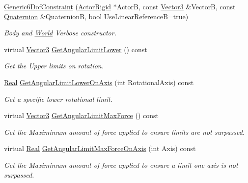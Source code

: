 \begin{DoxyCompactItemize}
\hyperlink{classphys_1_1Generic6DofConstraint_a6df8d1d30d1d2174fa2b194d0c051508}{Generic6DofConstraint} (\hyperlink{classphys_1_1ActorRigid}{ActorRigid} $\ast$ActorB, const \hyperlink{classphys_1_1Vector3}{Vector3} \&VectorB, const \hyperlink{classphys_1_1Quaternion}{Quaternion} \&QuaternionB, bool UseLinearReferenceB=true)
\begin{DoxyCompactList}\small\item\em Body and \hyperlink{classphys_1_1World}{World} Verbose constructor. \item\end{DoxyCompactList}\item 
virtual \hyperlink{classphys_1_1Vector3}{Vector3} \hyperlink{classphys_1_1Generic6DofConstraint_ad59c5b69ab45be96dfe37c7d05e3b73f}{GetAngularLimitLower} () const 
\begin{DoxyCompactList}\small\item\em Get the Upper limits on rotation. \item\end{DoxyCompactList}\item 
\hyperlink{namespacephys_af7eb897198d265b8e868f45240230d5f}{Real} \hyperlink{classphys_1_1Generic6DofConstraint_aa3d8315b419fcb6857cadef872cce390}{GetAngularLimitLowerOnAxis} (int RotationalAxis) const 
\begin{DoxyCompactList}\small\item\em Get a specific lower rotational limit. \item\end{DoxyCompactList}\item 
virtual \hyperlink{classphys_1_1Vector3}{Vector3} \hyperlink{classphys_1_1Generic6DofConstraint_a1cd01286c513bd3caa024c349a69de44}{GetAngularLimitMaxForce} () const 
\begin{DoxyCompactList}\small\item\em Get the Maximimum amount of force applied to ensure limits are not surpassed. \item\end{DoxyCompactList}\item 
virtual \hyperlink{namespacephys_af7eb897198d265b8e868f45240230d5f}{Real} \hyperlink{classphys_1_1Generic6DofConstraint_a3d008cfe84a1eb0e9b0086fbcc8ae945}{GetAngularLimitMaxForceOnAxis} (int Axis) const 
\begin{DoxyCompactList}\small\item\em Get the Maximimum amount of force applied to ensure a limit one axis is not surpassed. \item\end{DoxyCompactList}\item 

\end{DoxyCompactItemize}
